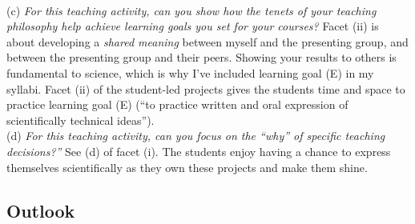 \documentclass[../../../main.tex]{subfiles}
\begin{document}
\\
\vspace{0.25cm}
(c) \textit{For this teaching activity, can you show how the tenets of your teaching philosophy help achieve learning goals you
set for your courses?}  Facet (ii) is about developing a \textit{shared meaning} between myself and the presenting group, and between the presenting group and their peers.  Showing your results to others is fundamental to science, which is why I've included learning goal (E) in my syllabi.  Facet (ii) of the student-led projects gives the students time and space to practice learning goal (E) (``to practice written and oral expression of scientifically technical ideas'').
\\
\vspace{0.25cm}
(d) \textit{For this teaching activity, can you focus on the ``why'' of specific teaching decisions?''}  See (d) of facet (i).  The students enjoy having a chance to express themselves scientifically as they own these projects and make them shine.

\subsection{Outlook}
\end{document}
